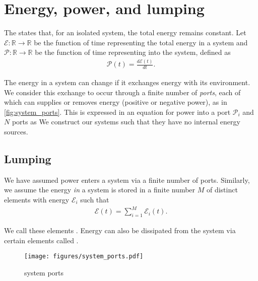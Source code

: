 \documentclass[dynamic_systems.tex]{subfiles}
\begin{document}
\section{Energy, power, and lumping}
\tags{}

The  states that, for an isolated system, the total energy remains constant.
Let $\mathcal{E}:\mathbb{R}\rightarrow\mathbb{R}$ be the function of time representing the total energy in a system and $\mathcal{P}:\mathbb{R}\rightarrow\mathbb{R}$ be the function of time representing  into the system, defined as
\tags{}
\begin{align}
	\mathcal{P}(t) = \frac{d \mathcal{E}(t)}{d t}.
\end{align}

The energy in a system can change if it exchanges energy with its environment.
We consider this exchange to occur through a finite number of \emph{ports}, each of which can supplies or removes energy (positive or negative power), as in \autoref{fig:system_ports}.
This is expressed in an equation for power into a port $\mathcal{P}_i$ and $N$ ports as
\tags{}
We construct our systems such that they have no internal energy sources.

\subsection{Lumping}
\tags{}

We have assumed power enters a system via a finite number of ports.
Similarly, we assume the energy \emph{in} a system is stored in a finite number $M$ of distinct elements with energy $\mathcal{E}_i$ such that
\tags{}
\begin{align}
	\mathcal{E}(t) = \sum_{i=1}^M \mathcal{E}_i(t).
\end{align}

We call these elements . Energy can also be dissipated from the system via certain elements called .

\begin{figure}[bt]
	\centering
	\texttt{[image: figures/system\_ports.pdf]}
	\caption{system ports}
	\label{fig:system_ports}
\end{figure}
\end{document}
